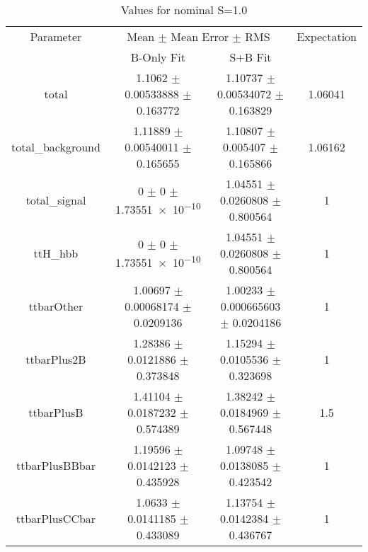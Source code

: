 \begin{table}
\centering
\caption{Values for nominal S=1.0}
\begin{tabular}{cccc}
\toprule
Parameter & \multicolumn{2}{c}{Mean $\pm$ Mean Error $\pm$ RMS} & Expectation\\
 & B-Only Fit & S+B Fit & \\
\midrule
total & \num{1.1062} $\pm$ \num{0.00533888} $\pm$ \num{0.163772} & \num{1.10737} $\pm$ \num{0.00534072} $\pm$ \num{0.163829} & \num{1.06041}\\
total\_background & \num{1.11889} $\pm$ \num{0.00540011} $\pm$ \num{0.165655} & \num{1.10807} $\pm$ \num{0.005407} $\pm$ \num{0.165866} & \num{1.06162}\\
total\_signal & \num{0} $\pm$ \num{0} $\pm$ \num{1.73551e-10} & \num{1.04551} $\pm$ \num{0.0260808} $\pm$ \num{0.800564} & \num{1}\\
ttH\_hbb & \num{0} $\pm$ \num{0} $\pm$ \num{1.73551e-10} & \num{1.04551} $\pm$ \num{0.0260808} $\pm$ \num{0.800564} & \num{1}\\
ttbarOther & \num{1.00697} $\pm$ \num{0.00068174} $\pm$ \num{0.0209136} & \num{1.00233} $\pm$ \num{0.000665603} $\pm$ \num{0.0204186} & \num{1}\\
ttbarPlus2B & \num{1.28386} $\pm$ \num{0.0121886} $\pm$ \num{0.373848} & \num{1.15294} $\pm$ \num{0.0105536} $\pm$ \num{0.323698} & \num{1}\\
ttbarPlusB & \num{1.41104} $\pm$ \num{0.0187232} $\pm$ \num{0.574389} & \num{1.38242} $\pm$ \num{0.0184969} $\pm$ \num{0.567448} & \num{1.5}\\
ttbarPlusBBbar & \num{1.19596} $\pm$ \num{0.0142123} $\pm$ \num{0.435928} & \num{1.09748} $\pm$ \num{0.0138085} $\pm$ \num{0.423542} & \num{1}\\
ttbarPlusCCbar & \num{1.0633} $\pm$ \num{0.0141185} $\pm$ \num{0.433089} & \num{1.13754} $\pm$ \num{0.0142384} $\pm$ \num{0.436767} & \num{1}\\
\bottomrule
\end{tabular}
\end{table}